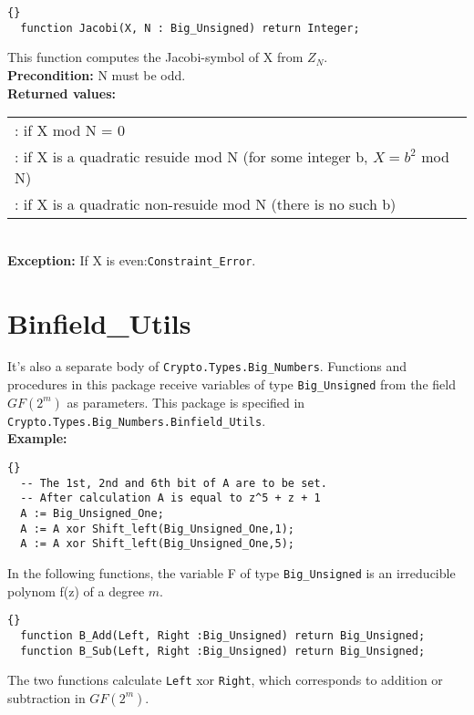\hhline
\begin{lstlisting}{}
  function Jacobi(X, N : Big_Unsigned) return Integer;
\end{lstlisting}
This function computes the Jacobi-symbol of X from $Z_N$.\\

\noindent\textbf{Precondition:} N must be odd.\\

\noindent\textbf{Returned values:} \\
\begin{tabular}{p{\textwidth}}
\quad 0 : if X mod N = 0\\
\quad 1 : if X is a quadratic resuide mod N (for some integer b, $X=b^2$ mod N)\\
\quad -1 : if X is a quadratic non-resuide mod N (there is no such b)
\end{tabular}\ \\

\noindent\textbf{Exception:} If X is even:\quad \texttt{Constraint\_Error}.


\section{Binfield\_Utils}
It's also a separate body of
\texttt{Crypto.Types.Big\_Numbers}. Functions and procedures in this
package receive variables of type \texttt{Big\_Unsigned} from the
field $GF(2^m)$ as parameters. This package is specified in
\texttt{Crypto.Types.Big\_Numbers.Binfield\_Utils}.\\

\noindent\textbf{Example:}
\begin{lstlisting}{}
  -- The 1st, 2nd and 6th bit of A are to be set.
  -- After calculation A is equal to z^5 + z + 1
  A := Big_Unsigned_One;
  A := A xor Shift_left(Big_Unsigned_One,1);
  A := A xor Shift_left(Big_Unsigned_One,5);
\end{lstlisting}
In the following functions, the variable F of type
\texttt{Big\_Unsigned} is an irreducible polynom f(z) of a degree
$m$.

\begin{lstlisting}{}
  function B_Add(Left, Right :Big_Unsigned) return Big_Unsigned;
  function B_Sub(Left, Right :Big_Unsigned) return Big_Unsigned;
\end{lstlisting}
The two functions calculate \texttt{Left} xor \texttt{Right}, which
corresponds to addition or subtraction in $GF(2^m)$.


